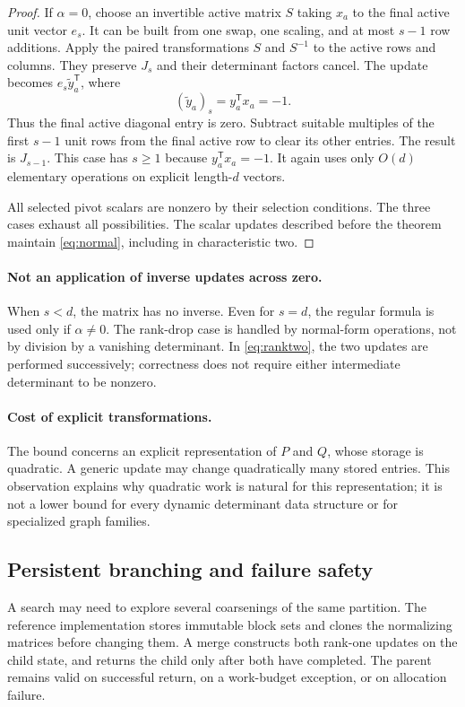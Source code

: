 \documentclass[11pt,letterpaper]{article}
\theoremstyle{definition}\newtheorem{definition}[theorem]{Definition}
\theoremstyle{remark}\newtheorem{remark}[theorem]{Remark}
\newcommand{\trans}{^{\mathsf T}}
\begin{document}
\begin{proof}
If $\alpha=0$, choose an invertible active matrix $S$ taking $x_a$ to the final active unit vector $e_s$. It can be built from one swap, one scaling, and at most $s-1$ row additions. Apply the paired transformations $S$ and $S^{-1}$ to the active rows and columns. They preserve $J_s$ and their determinant factors cancel. The update becomes $e_s\widetilde y_a\trans$, where
\[
 (\widetilde y_a)_s=y_a\trans x_a=-1.
\]
Thus the final active diagonal entry is zero. Subtract suitable multiples of the first $s-1$ unit rows from the final active row to clear its other entries. The result is $J_{s-1}$. This case has $s\geq1$ because $y_a\trans x_a=-1$. It again uses only $O(d)$ elementary operations on explicit length-$d$ vectors.

All selected pivot scalars are nonzero by their selection conditions. The three cases exhaust all possibilities. The scalar updates described before the theorem maintain \eqref{eq:normal}, including in characteristic two.
\end{proof}

\paragraph{Not an application of inverse updates across zero.}
When $s<d$, the matrix has no inverse. Even for $s=d$, the regular formula is used only if $\alpha\neq0$. The rank-drop case is handled by normal-form operations, not by division by a vanishing determinant. In \eqref{eq:ranktwo}, the two updates are performed successively; correctness does not require either intermediate determinant to be nonzero.

\paragraph{Cost of explicit transformations.}
The bound concerns an explicit representation of $P$ and $Q$, whose storage is quadratic. A generic update may change quadratically many stored entries. This observation explains why quadratic work is natural for this representation; it is not a lower bound for every dynamic determinant data structure or for specialized graph families.

\subsection{Persistent branching and failure safety}
A search may need to explore several coarsenings of the same partition. The reference implementation stores immutable block sets and clones the normalizing matrices before changing them. A merge constructs both rank-one updates on the child state, and returns the child only after both have completed. The parent remains valid on successful return, on a work-budget exception, or on allocation failure.
\end{document}
